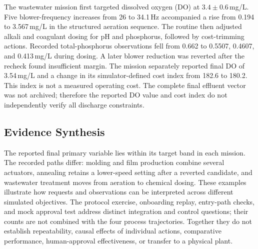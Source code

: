 The wastewater mission first targeted dissolved oxygen (DO) at
$3.4\pm0.6$\,mg/L. Five blower-frequency increases from 26 to 34.1\,Hz
accompanied a rise from 0.194 to 3.567\,mg/L in the structured aeration
sequence. The routine then adjusted alkali and coagulant dosing for pH and
phosphorus, followed by cost-trimming actions. Recorded total-phosphorus
observations fell from 0.662 to 0.5507, 0.4607, and 0.413\,mg/L during dosing.
A later blower reduction was reverted after the recheck found insufficient
margin. The mission separately
reported final DO of 3.54\,mg/L and a change in its simulator-defined cost
index from 182.6 to 180.2. This index is not a measured operating cost. The
complete final effluent vector was not archived; therefore the reported DO
value and cost index do not independently verify all discharge constraints.

\subsection{Evidence Synthesis}
The reported final primary variable lies within its target band in each
mission. The recorded paths differ: molding and film production combine
several actuators, annealing retains a lower-speed setting after a reverted
candidate, and wastewater treatment moves from aeration to chemical dosing.
These examples illustrate how requests and observations can be interpreted
across different simulated objectives. The protocol exercise, onboarding
replay, entry-path checks, and mock approval test address distinct integration and control
questions; their counts are not combined with the four process trajectories.
Together they do not establish
repeatability, causal effects of individual actions, comparative performance,
human-approval effectiveness, or transfer to a physical plant.

